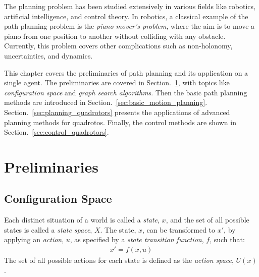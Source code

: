 The planning problem has been studied extensively in various fields like robotics, artificial intelligence, and control theory. In robotics, a classical example of the path planning problem is the \textit{piano-mover's problem}, where the aim is to move a piano from one position to another without colliding with any obstacle. Currently, this problem covers other complications such as non-holonomy, uncertainties, and dynamics.

This chapter covers the preliminaries of path planning and its application on a single agent. The preliminaries are covered in Section.~\ref{sec:prelims}, with topics like \textit{configuration space} and \textit{graph search algorithms}. Then the basic path planning methods are introduced in Section.~\ref{sec:basic_motion_planning}. Section.~\ref{sec:planning_quadrotors} presents the applications of advanced planning methods for quadrotos. Finally, the control methods are shown in Section.~\ref{sec:control_quadrotors}.
\section{Preliminaries}
\label{sec:prelims}
\subsection{Configuration Space}
\label{sec:config_space}
Each distinct situation of a world is called a \textit{state}, $x$, and the set of all possible states is called a \textit{state space}, $X$. The state, $x$, can be transformed to $x'$, by applying an \textit{action}, $u$, as specified by a \textit{state transition function}, $f$, such that:
\begin{align}
	x' = f(x,u)
\end{align}
The set of all possible actions for each state is defined as the \textit{action space}, $U(x)$.



